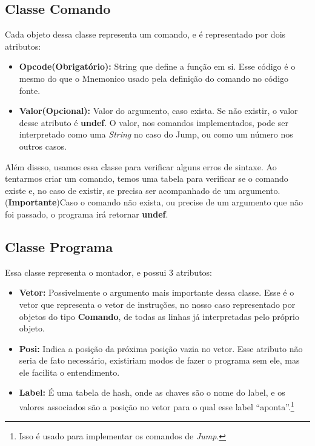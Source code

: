 \documentclass[11pt]{article}
\begin{document}
\subsection{Classe Comando}

Cada objeto dessa classe representa um comando, e é representado por dois atributos:

\begin{itemize}

\item \textbf{Opcode({\color{red}Obrigatório}):} String que define a função em si. Esse código é o mesmo do que o Mnemonico usado pela definição do comando no código fonte.

\item \textbf{Valor({\color{red}Opcional}):} Valor do argumento, caso exista. Se não existir, o valor desse atributo é \textbf{\color{blue}undef}. O valor, nos comandos implementados, pode ser interpretado como uma \emph{String} no caso do Jump, ou como um número nos outros casos.

\end{itemize}

Além dissso, usamos essa classe para verificar alguns erros de sintaxe. Ao tentarmos criar um comando, temos uma tabela para verificar se o comando existe e, no caso de existir, se precisa ser acompanhado de um argumento.(\textbf{\color{red}Importante})Caso o comando não exista, ou precise de um argumento que não foi passado, o programa irá retornar \textbf{\color{blue}undef}.

\subsection{Classe Programa}

Essa classe representa o montador, e possui 3 atributos:

\begin{itemize}

\item \textbf{Vetor:} Possivelmente o argumento mais importante dessa classe. Esse é o vetor que representa o vetor de instruções, no nosso caso representado por objetos do tipo \textbf{\color{red}Comando}, de todas as linhas já interpretadas pelo próprio objeto.

\item \textbf{Posi:} Indica a posição da próxima posição vazia no vetor. Esse atributo não seria de fato necessário, existiriam modos de fazer o programa sem ele, mas ele facilita o entendimento.




\item \textbf{Label:} É uma tabela de hash, onde as {\color{red}chaves} são o nome do label, e os {\color{red}valores associados} são a posição no vetor para o qual esse label ``aponta''.\footnote{Isso é usado para implementar os comandos de \emph{Jump}.}

\end{itemize}
\end{document}
